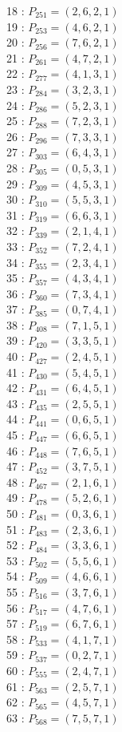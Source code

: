 \documentclass{article}
\begin{document}
{\begin{multicols}{2}
18 : $P_{251}=( 2, 6, 2, 1 )$\\
19 : $P_{253}=( 4, 6, 2, 1 )$\\
20 : $P_{256}=( 7, 6, 2, 1 )$\\
21 : $P_{261}=( 4, 7, 2, 1 )$\\
22 : $P_{277}=( 4, 1, 3, 1 )$\\
23 : $P_{284}=( 3, 2, 3, 1 )$\\
24 : $P_{286}=( 5, 2, 3, 1 )$\\
25 : $P_{288}=( 7, 2, 3, 1 )$\\
26 : $P_{296}=( 7, 3, 3, 1 )$\\
27 : $P_{303}=( 6, 4, 3, 1 )$\\
28 : $P_{305}=( 0, 5, 3, 1 )$\\
29 : $P_{309}=( 4, 5, 3, 1 )$\\
30 : $P_{310}=( 5, 5, 3, 1 )$\\
31 : $P_{319}=( 6, 6, 3, 1 )$\\
32 : $P_{339}=( 2, 1, 4, 1 )$\\
33 : $P_{352}=( 7, 2, 4, 1 )$\\
34 : $P_{355}=( 2, 3, 4, 1 )$\\
35 : $P_{357}=( 4, 3, 4, 1 )$\\
36 : $P_{360}=( 7, 3, 4, 1 )$\\
37 : $P_{385}=( 0, 7, 4, 1 )$\\
38 : $P_{408}=( 7, 1, 5, 1 )$\\
39 : $P_{420}=( 3, 3, 5, 1 )$\\
40 : $P_{427}=( 2, 4, 5, 1 )$\\
41 : $P_{430}=( 5, 4, 5, 1 )$\\
42 : $P_{431}=( 6, 4, 5, 1 )$\\
43 : $P_{435}=( 2, 5, 5, 1 )$\\
44 : $P_{441}=( 0, 6, 5, 1 )$\\
45 : $P_{447}=( 6, 6, 5, 1 )$\\
46 : $P_{448}=( 7, 6, 5, 1 )$\\
47 : $P_{452}=( 3, 7, 5, 1 )$\\
48 : $P_{467}=( 2, 1, 6, 1 )$\\
49 : $P_{478}=( 5, 2, 6, 1 )$\\
50 : $P_{481}=( 0, 3, 6, 1 )$\\
51 : $P_{483}=( 2, 3, 6, 1 )$\\
52 : $P_{484}=( 3, 3, 6, 1 )$\\
53 : $P_{502}=( 5, 5, 6, 1 )$\\
54 : $P_{509}=( 4, 6, 6, 1 )$\\
55 : $P_{516}=( 3, 7, 6, 1 )$\\
56 : $P_{517}=( 4, 7, 6, 1 )$\\
57 : $P_{519}=( 6, 7, 6, 1 )$\\
58 : $P_{533}=( 4, 1, 7, 1 )$\\
59 : $P_{537}=( 0, 2, 7, 1 )$\\
60 : $P_{555}=( 2, 4, 7, 1 )$\\
61 : $P_{563}=( 2, 5, 7, 1 )$\\
62 : $P_{565}=( 4, 5, 7, 1 )$\\
63 : $P_{568}=( 7, 5, 7, 1 )$\\
\end{multicols}
}
\end{document}
